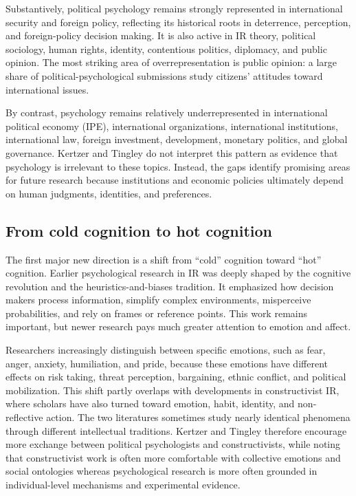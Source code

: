 Substantively, political psychology remains strongly represented in international security and foreign policy, reflecting its historical roots in deterrence, perception, and foreign-policy decision making. It is also active in IR theory, political sociology, human rights, identity, contentious politics, diplomacy, and public opinion. The most striking area of overrepresentation is public opinion: a large share of political-psychological submissions study citizens' attitudes toward international issues.

By contrast, psychology remains relatively underrepresented in international political economy (IPE), international organizations, international institutions, international law, foreign investment, development, monetary politics, and global governance. Kertzer and Tingley do not interpret this pattern as evidence that psychology is irrelevant to these topics. Instead, the gaps identify promising areas for future research because institutions and economic policies ultimately depend on human judgments, identities, and preferences.

\subsection{From cold cognition to hot cognition}

The first major new direction is a shift from ``cold'' cognition toward ``hot'' cognition. Earlier psychological research in IR was deeply shaped by the cognitive revolution and the heuristics-and-biases tradition. It emphasized how decision makers process information, simplify complex environments, misperceive probabilities, and rely on frames or reference points. This work remains important, but newer research pays much greater attention to emotion and affect.

Researchers increasingly distinguish between specific emotions, such as fear, anger, anxiety, humiliation, and pride, because these emotions have different effects on risk taking, threat perception, bargaining, ethnic conflict, and political mobilization. This shift partly overlaps with developments in constructivist IR, where scholars have also turned toward emotion, habit, identity, and non-reflective action. The two literatures sometimes study nearly identical phenomena through different intellectual traditions. Kertzer and Tingley therefore encourage more exchange between political psychologists and constructivists, while noting that constructivist work is often more comfortable with collective emotions and social ontologies whereas psychological research is more often grounded in individual-level mechanisms and experimental evidence.

